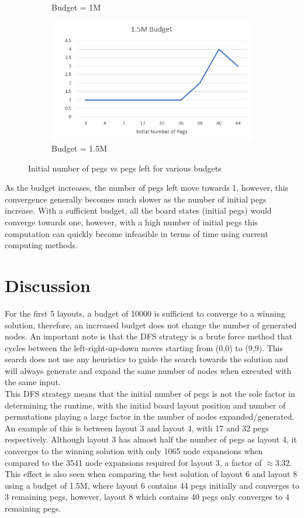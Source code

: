 \documentclass[12pt,a4paper]{article}
\begin{document}
\begin{figure}[H]
\begin{subfigure}{.5\textwidth}
  \caption{Budget = 1M}
  \label{fig:sub1}
\end{subfigure}%
\begin{subfigure}{.5\textwidth}
  \centering
  \includegraphics[width=1\linewidth]{1.5M.png}
  \caption{Budget = 1.5M }
  \label{fig:sub2}
\end{subfigure}
\caption{Initial number of pegs vs pegs left for various budgets}
\label{fig:test}
\end{figure}
As the budget increases, the number of pegs left move towards 1, however, this convergence generally becomes much slower as the number of initial pegs increase. With a sufficient budget, all the board states (initial pegs) would converge towards one, however, with a high number of initial pegs this computation can quickly become infeasible in terms of time using current computing methods.

\section{Discussion}
For the first 5 layouts, a budget of 10000 is sufficient to converge to a winning solution, therefore, an increased budget does not change the number of generated nodes. An important note is that the DFS strategy is a brute force method that cycles between the left-right-up-down moves starting from (0,0) to (9,9). This search does not use any heuristics to guide the search towards the solution and will always generate and expand the same number of nodes when executed with the same input.
\\

This DFS strategy means that the initial number of pegs is not the sole factor in determining the runtime, with the initial board layout position and number of permutations playing a large factor in the number of nodes expanded/generated. An example of this is between layout 3 and layout 4, with 17 and 32 pegs respectively. Although layout 3 has almost half the number of pegs as layout 4, it converges to the winning solution with only 1065 node expansions when compared to the 3541 node expansions required for layout 3, a factor of $\approx3.32$. This effect is also seen when comparing the best solution of layout 6 and layout 8 using a budget of 1.5M, where layout 6 contains 44 pegs initially and converges to 3 remaining pegs, however, layout 8 which contains 40 pegs only converges to 4 remaining pegs.
\\
\end{document}
